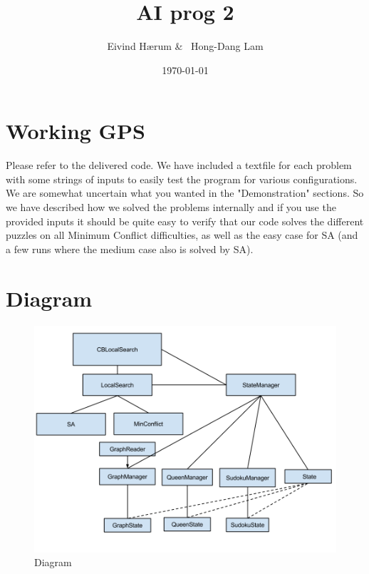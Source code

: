 \documentclass[12pt, a4paper]{article}
\title{AI prog 2}
\author{Eivind Hærum \& \ Hong-Dang Lam}
\date{\today} %
\begin{document}
\maketitle
% 
% 
 
\newpage
\tableofcontents
\newpage
 
\section{Working GPS}
Please refer to the delivered code.
We have included a textfile for each problem with some strings of inputs to easily test the program for various configurations. We are somewhat uncertain what you wanted in the "Demonstration" sections. So we have described how we solved the problems internally and if you use the provided inputs it should be quite easy to verify that our code solves the different puzzles on all Minimum Conflict difficulties, as well as the easy case for SA (and a few runs where the medium case also is solved by SA).

\section{Diagram}
\begin{figure}[H] \includegraphics[width=20cm]{2_Diagram}

\caption{Diagram}
\label{diagram}
\end{figure}
\end{document}
